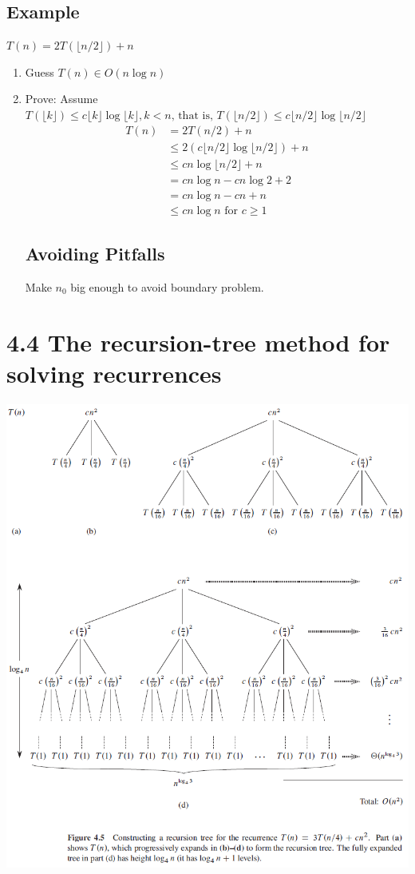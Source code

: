 \documentclass[a4paper]{article}
\theoremstyle{plain}
\begin{document}
\subsection*{Example} 
$T(n)=2T(\lfloor n/2\rfloor)+n$
\begin{enumerate}
    \item Guess $T(n)\in O(n \log n)$
    \item Prove: Assume $T(\lfloor{k}\rfloor)\leq c\lfloor{k}\rfloor\log{\lfloor{k}\rfloor}, k< n\text{, that is, }T(\lfloor{n/2}\rfloor)\leq c\lfloor{n/2}\rfloor\log{\lfloor{n/2}\rfloor}$
    \begin{align*}
 T(n) & = 2T(n/2) + n \\
 & \leq 2(c\lfloor{n/2}\rfloor\log{\lfloor{n/2}\rfloor})+n \\ 
 & \leq cn\log{\lfloor{n/2}\rfloor}+n \\
 & = cn \log{n} -cn\log{2}+2\\
 & = cn \log n - cn+n \\
 & \leq cn \log n \text{ for } c\geq 1
 \end{align*}
 \subsection*{Avoiding Pitfalls}
 Make $n_0$ big enough to avoid boundary problem.
\end{enumerate}
\section*{4.4 The recursion-tree method for solving recurrences}
\includegraphics[scale=0.7]{"recursion-tree"}
\end{document}
